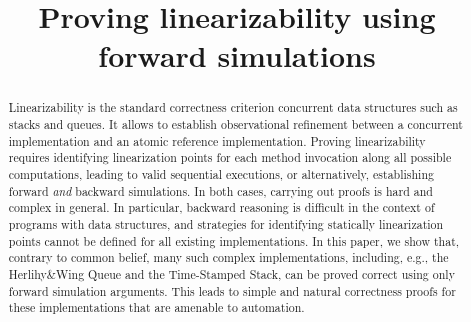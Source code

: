 \documentclass[orivec]{llncs}
\title{Proving linearizability using forward simulations}
\author{ }
\institute{ }
\begin{document}

\maketitle

\vspace{-9mm}
\begin{abstract}
Linearizability is the standard correctness criterion concurrent data structures such as stacks and queues. %
It allows to establish observational refinement between a concurrent implementation and an atomic reference implementation.
Proving linearizability requires identifying linearization points for each method invocation along all possible computations, leading to valid sequential executions, or alternatively, establishing forward \emph{and} backward simulations. In both cases, carrying out proofs is hard and complex in general. In particular, backward reasoning is difficult in the context of programs with data structures, and strategies for identifying statically linearization points cannot be defined for all existing implementations.  In this paper, we show that, contrary to common belief, many such complex implementations, including, e.g., the Herlihy\&Wing Queue and the Time-Stamped Stack, can be proved correct using only forward simulation arguments. This leads to simple and natural correctness proofs for these implementations that are amenable to automation. 

\vspace{-2mm}
\end{abstract}
\end{document}
